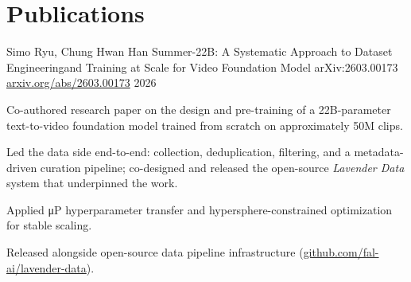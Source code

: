 \section{Publications}
\cventry
{Simo Ryu, Chung Hwan Han}
{Summer-22B: A Systematic Approach to Dataset Engineering\newline and Training at Scale for Video Foundation Model}
{arXiv:2603.00173 \textbar{} \href{https://arxiv.org/abs/2603.00173}{arxiv.org/abs/2603.00173}}
{2026}
\begin{cvitems}
\item {Co-authored research paper on the design and pre-training of a 22B-parameter text-to-video foundation model trained from scratch on approximately 50M clips.}
\item {Led the data side end-to-end: collection, deduplication, filtering, and a metadata-driven curation pipeline; co-designed and released the open-source \emph{Lavender Data} system that underpinned the work.}
\item {Applied μP hyperparameter transfer and hypersphere-constrained optimization for stable scaling.}
\item {Released alongside open-source data pipeline infrastructure (\href{https://github.com/fal-ai/lavender-data}{github.com/fal-ai/lavender-data}).}
\end{cvitems}
